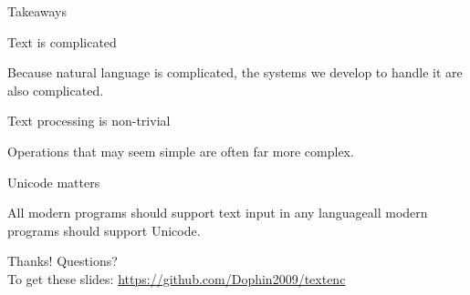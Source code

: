 \documentclass[../index.tex]{subfiles}
\begin{document}
\renewcommand{\currenttitle}{Takeaways}
\newcommand{\takeaway}[2]{%
  \begin{block}{#1}
    \vspace*{0.3em}
    #2
  \end{block}%
}
\begin{frame}{\currenttitle}
%
%
%
%
%
%
%
  \takeaway{Text is complicated}{
    Because natural language is complicated, the systems we develop to handle it are also
    complicated.
  }
  
  \takeaway{Text processing is non-trivial}{
    Operations that may seem simple are often far more complex.
  }
  
  \takeaway{Unicode matters}{
    All modern programs should support text input in any language\textemdash{}all
    modern programs should support Unicode.
  }

\end{frame}

\renewcommand{\sectiontitle}{Thanks!}
\begin{frame}{\sectiontitle}
%
%
  Questions? \\[2em]

  To get these slides: \url{https://github.com/Dophin2009/textenc}
\end{frame}

\end{document}
